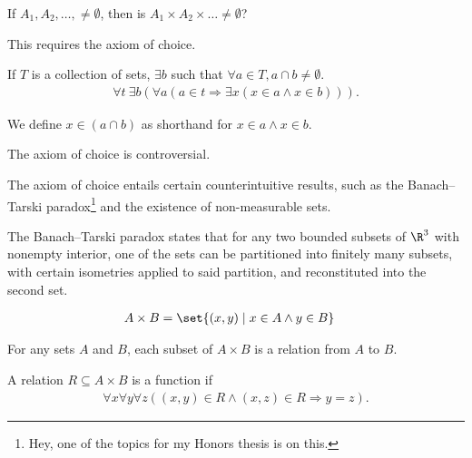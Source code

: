 \documentclass[10pt]{mypackage}
\begin{document}
\begin{question}
  If $A_1,A_2,\dots,\neq\emptyset$, then is $A_1\times A_2\times \dots \neq \emptyset$?
\begin{answer}
  This requires the axiom of choice.
\end{answer}
\end{question}
\begin{axiom}[Choice]
  If $T$ is a collection of sets, $\exists b$ such that $\forall a\in T, a\cap b \neq \emptyset$.
  \begin{align*}
    \forall t\:\exists b\left(\forall a\left(a\in t \Rightarrow \exists x\left(x\in a \wedge x\in b\right)\right)\right).
  \end{align*}
\end{axiom}
\begin{remark}
  We define $x\in \left(a\cap b\right) $ as shorthand for $ x\in a \wedge x\in b$.
\end{remark}
\begin{remark}
  The axiom of choice is controversial. 
\end{remark}
\begin{remark}
The axiom of choice entails certain counterintuitive results, such as the Banach--Tarski paradox\footnote{Hey, one of the topics for my Honors thesis is on this.} and the existence of non-measurable sets.\newline

The Banach--Tarski paradox states that for any two bounded subsets of $\R^3$ with nonempty interior, one of the sets can be partitioned into finitely many subsets, with certain isometries applied to said partition, and reconstituted into the second set.
\end{remark}
\begin{recall}
  \begin{align*}
    A\times B &= \set{(x,y)\mid x\in A \wedge y\in B}
  \end{align*}
\end{recall}
\begin{definition}
  For any sets $A$ and $B$, each subset of $A\times B$ is a relation from $A$ to $B$.
\end{definition}
\begin{definition}
  A relation $R\subseteq A\times B$ is a function if 
  \begin{align*}
    \forall x \forall y \forall z\left((x,y)\in R \wedge (x,z) \in R \Rightarrow y = z\right).
  \end{align*}
\end{definition}
\end{document}
